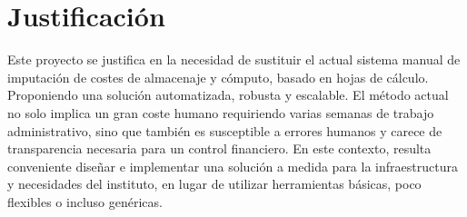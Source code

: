 \section{Justificación}
Este proyecto se justifica en la necesidad de sustituir el actual sistema manual de imputación 
de costes de almacenaje y cómputo, basado en hojas de cálculo. Proponiendo una solución automatizada, 
robusta y escalable. El método actual no solo implica un gran coste humano requiriendo varias semanas 
de trabajo administrativo, sino que también es susceptible a errores humanos y carece de transparencia 
necesaria para un control financiero. En este contexto, resulta conveniente diseñar e implementar una 
solución a medida para la infraestructura y necesidades del instituto, en lugar de utilizar herramientas 
básicas, poco flexibles o incluso genéricas.




